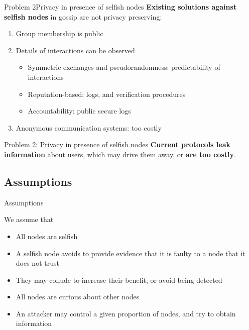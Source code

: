 \documentclass[10pt]{beamer}
\begin{document}
\begin{frame}{Problem 2}{Privacy in presence of selfish nodes}
      \textbf{Existing solutions against selfish nodes} in gossip are not privacy preserving:
         \begin{enumerate}
         \item Group membership is public
         \item Details of interactions can be observed
         \begin{itemize}
            \item Symmetric exchanges and pseudorandomness: predictability of interactions
            \item Reputation-based: logs, and verification procedures
            \item Accountability: public secure logs
         \end{itemize}
         \item Anonymous communication systems: too costly 
         \end{enumerate}
 
  \begin{block}{Problem 2: Privacy in presence of selfish nodes}
     \textbf{Current protocols leak information} about users, which may drive them away, or \textbf{are too costly}.
  \end{block}
 
\end{frame}

\subsection{Assumptions}
\begin{frame}{Assumptions}{} 
   \begin{block}{}
   We assume that
   \begin{itemize}
   \item All nodes are selfish
   \item A selfish node avoids to provide evidence that it is faulty to a node that it does not trust
   \item \sout{They may collude to increase their benefit, or avoid being detected}
   \item All nodes are curious about other nodes
   \item An attacker may control a given proportion of nodes, and try to obtain information
   \end{itemize}
   \end{block}
\end{frame}
\end{document}
